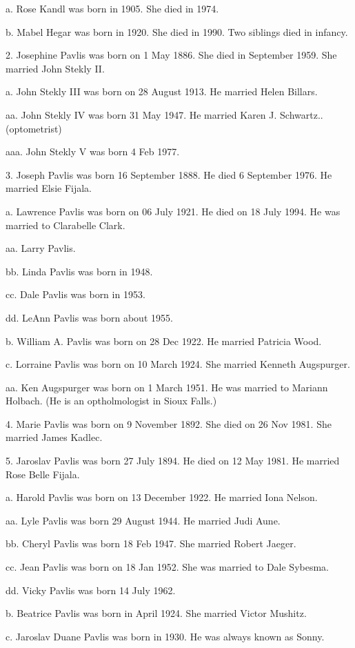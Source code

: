 \documentclass[a4paper]{article}
\begin{document}
a. Rose Kandl was born in 1905.  She died in 1974.  

b. Mabel Hegar was born in 1920.  She died in 1990.  Two siblings died in infancy.

2. Josephine Pavlis was born on 1 May 1886.  She died in September 1959. She married John Stekly II.

a. John Stekly III was born on 28 August 1913.  He married Helen Billars.

aa. John Stekly IV was born 31 May 1947.  He married Karen J. Schwartz..  (optometrist)

aaa. John Stekly V was born 4 Feb 1977.

3. Joseph Pavlis was born 16 September 1888.  He died 6 September 1976.  He married Elsie Fijala.

a. Lawrence Pavlis was born on 06 July 1921.  He died on 18 July 1994. He was married to Clarabelle Clark.

aa. Larry Pavlis.

bb. Linda Pavlis was born in 1948.

cc. Dale Pavlis was born in 1953.

dd. LeAnn Pavlis was born about 1955.

b. William A. Pavlis was born on 28 Dec 1922.  He married Patricia Wood.

c. Lorraine Pavlis was born on 10 March 1924.  She married Kenneth Augspurger.

aa. Ken Augspurger was born on 1 March 1951.  He was married to Mariann Holbach. (He is an optholmologist in Sioux Falls.)

4. Marie Pavlis was born on 9 November 1892.  She died on 26 Nov 1981.  She married James Kadlec.

5. Jaroslav Pavlis was born 27 July 1894.  He died on 12 May 1981.  He married Rose Belle Fijala.  

a.  Harold Pavlis was born on 13 December 1922.  He married Iona Nelson.  

aa. Lyle Pavlis was born 29 August 1944.  He married Judi Aune.

bb. Cheryl Pavlis was born 18 Feb 1947.  She married Robert Jaeger.

cc. Jean Pavlis was born on 18 Jan 1952.  She was married to Dale Sybesma.

dd. Vicky Pavlis was born 14 July 1962.

b. Beatrice Pavlis was born in April 1924.  She married Victor Mushitz.

c. Jaroslav Duane Pavlis was born in 1930.  He was always known as Sonny.
\end{document}
